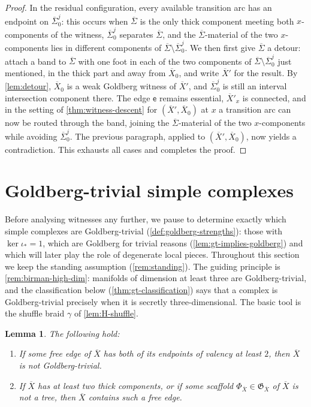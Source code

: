 \documentclass[reqno]{amsart}
\newtheorem{lemma}[theorem]{Lemma}
\theoremstyle{definition}
\newcommand\frG{\mathfrak{G}}
\newcommand\sfe{\mathsf{e}}
\renewcommand{\bar}{\overline}
\numberwithin{equation}{section}
\begin{document}
\begin{proof}
In the residual configuration, every available transition arc
has an endpoint on \(\bar\Sigma_0^j\): this occurs when
\(\bar\Sigma\) is the only thick component meeting both
\(x\)-components of the witness, \(\bar\Sigma_0^j\) separates
\(\bar\Sigma\), and the \(\bar\Sigma\)-material of the two
\(x\)-components lies in different components of
\(\bar\Sigma\setminus\bar\Sigma_0^j\). We then first give
\(\bar\Sigma\) a detour: attach a band to \(\bar\Sigma\) with
one foot in each of the two components of
\(\bar\Sigma\setminus\bar\Sigma_0^j\) just mentioned, in the
thick part and away from \(\bar X_0\), and write \(\bar X'\)
for the result. By \cref{lem:detour}, \(\bar X_0\) is a weak
Goldberg witness of \(\bar X'\), and \(\bar\Sigma_0^j\) is
still an interval intersection component there. The edge \(\sfe\)
remains essential, \(\bar X'_x\) is connected, and in the
setting of \cref{thm:witness-descent} for
\((\bar X',\bar X_0)\) at \(x\) a transition arc can now be
routed through the band, joining the \(\bar\Sigma\)-material
of the two \(x\)-components while avoiding
\(\bar\Sigma_0^j\). The previous paragraph, applied to
\((\bar X',\bar X_0)\), now yields a contradiction. This
exhausts all cases and completes the proof.
\end{proof}

\section{Goldberg-trivial simple complexes}
\label{sec:goldberg-trivial}

Before analysing witnesses any further, we pause to determine
exactly which simple complexes are Goldberg-trivial
(\cref{def:goldberg-strengths}): those with
\(\ker\iota_\ast=1\), which are Goldberg for trivial reasons
(\cref{lem:gt-implies-goldberg}) and which will later play the role of
degenerate local pieces. Throughout this section we keep the
standing assumption (\cref{rem:standing}). The guiding principle
is \cref{rem:birman-high-dim}: manifolds of dimension at least
three are Goldberg-trivial, and the classification below
(\cref{thm:gt-classification}) says that a complex is
Goldberg-trivial precisely when it is secretly three-dimensional.
The basic tool is the shuffle braid \(\gamma\) of
\cref{lem:H-shuffle}.

\begin{lemma}\label{lem:val2-free-edge}
The following hold:
\begin{enumerate}[label=\textup{(\alph*)}, leftmargin=2em]
    \item If some free edge of \(\bar X\) has both of its
          endpoints of valency at least \(2\), then \(\bar X\) is
          not Goldberg-trivial.
    \item If \(\bar X\) has at least two thick components, or
          if some scaffold
          \(\Phi_{\bar X}\in\frG_{\bar X}\) of \(\bar X\) is not
          a tree, then \(\bar X\) contains such a free edge.
\end{enumerate}
\end{lemma}
\end{document}
